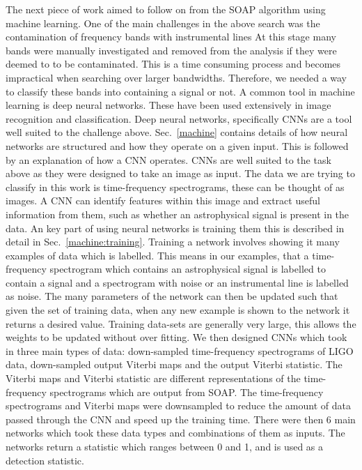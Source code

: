 The next piece of work aimed to follow on from the SOAP algorithm using machine learning.
One of the main challenges in the above search was the contamination of frequency bands with instrumental lines
At this stage many bands were manually investigated and removed from the analysis if they were deemed to to be contaminated.
This is a time consuming process and becomes impractical when searching over larger bandwidths.
Therefore, we needed a way to classify these bands into containing a signal or not.
A common tool in machine learning is deep neural networks. 
These have been used extensively in image recognition and classification.
Deep neural networks, specifically \glspl{CNN} are a tool well suited to the challenge above.
Sec.~\ref{machine} contains details of how neural networks are structured and how they operate on a given input.
This is followed by an explanation of how a \gls{CNN} operates.
\glspl{CNN} are well suited to the task above as they were designed to take an image as input.
The data we are trying to classify in this work is time-frequency spectrograms, these can be thought of as images.
A \gls{CNN} can identify features within this image and extract useful information from them, such as whether an astrophysical signal is present in the data.
An key part of using neural networks is training them this is described in detail in Sec.~\ref{machine:training}.
Training a network involves showing it many examples of data which is labelled.
This means in our examples, that a time-frequency spectrogram which contains an astrophysical signal is labelled to contain a signal and a spectrogram with noise or an instrumental line is labelled as noise.
The many parameters of the network can then be updated such that given the set of training data, when any new example is shown to the network it returns a desired value.
Training data-sets are generally very large, this allows the weights to be updated without over fitting. 
We then designed \glspl{CNN} which took in three main types of data: down-sampled time-frequency spectrograms of \gls{LIGO} data, down-sampled output Viterbi maps and the output Viterbi statistic.
The Viterbi maps and Viterbi statistic are different representations of the time-frequency spectrograms which are output from SOAP.
The time-frequency spectrograms and Viterbi maps were downsampled to reduce the amount of data passed through the \gls{CNN} and speed up the training time.
There were then 6 main networks which took these data types and combinations of them as inputs. 
The networks return a statistic which ranges between 0 and 1, and is used as a detection statistic. 
